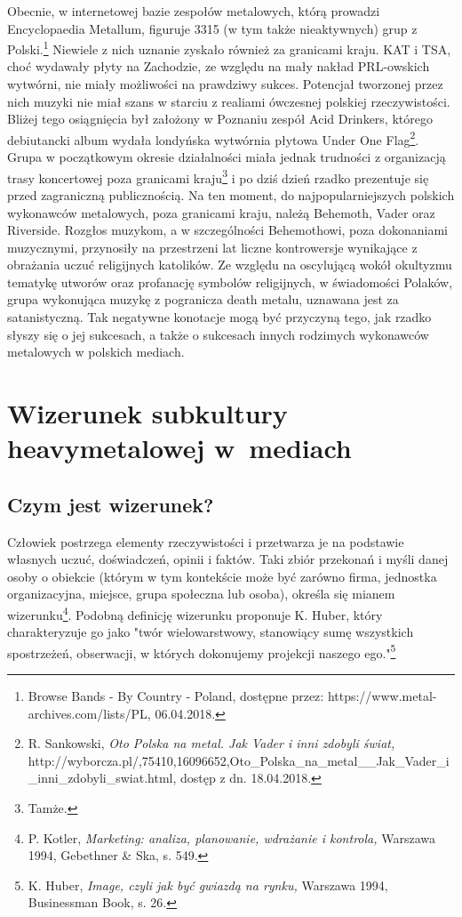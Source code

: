 \documentclass[12pt, a4paper, titlepage]{report}
\begin{document}
Obecnie, w internetowej bazie zespołów metalowych, którą prowadzi Encyclopaedia Metallum, figuruje 3315 (w tym także nieaktywnych) grup z Polski.\footnote{Browse Bands - By Country - Poland, dostępne przez: https://www.metal-archives.com/lists/PL, 06.04.2018.} Niewiele z nich uznanie zyskało również za granicami kraju. KAT i TSA, choć wydawały płyty na Zachodzie, ze względu na mały nakład PRL-owskich wytwórni, nie miały możliwości na prawdziwy sukces. Potencjał tworzonej przez nich muzyki nie miał szans w starciu z realiami ówczesnej polskiej rzeczywistości. Bliżej tego osiągnięcia był założony w Poznaniu zespół Acid Drinkers, którego debiutancki album wydała londyńska wytwórnia płytowa Under One Flag\footnote{R. Sankowski, \textit{Oto Polska na metal. Jak Vader i inni zdobyli świat,} http://wyborcza.pl/,75410,16096652,Oto_Polska_na_metal__Jak_Vader_i_inni_zdobyli_swiat.html, dostęp z dn. 18.04.2018.}. Grupa w początkowym okresie działalności miała jednak trudności z organizacją trasy koncertowej poza granicami kraju\footnote{Tamże.} i po dziś dzień rzadko prezentuje się przed zagraniczną publicznością. Na ten moment, do najpopularniejszych polskich wykonawców metalowych, poza granicami kraju, należą Behemoth, Vader oraz Riverside. Rozgłos muzykom, a w szczególności Behemothowi, poza dokonaniami muzycznymi, przynosiły na przestrzeni lat liczne kontrowersje wynikające z obrażania uczuć religijnych katolików. Ze względu na oscylującą wokół okultyzmu tematykę utworów oraz profanację symbolów religijnych, w świadomości Polaków, grupa wykonująca muzykę z pogranicza death metalu, uznawana jest za satanistyczną. Tak negatywne konotacje mogą być przyczyną tego, jak rzadko słyszy się o jej sukcesach, a także o sukcesach innych rodzimych wykonawców metalowych w polskich mediach. 

\chapter{Wizerunek subkultury heavymetalowej w~mediach}
\section{Czym jest wizerunek?}
Człowiek postrzega elementy rzeczywistości i przetwarza je na podstawie własnych uczuć, doświadczeń, opinii i faktów. Taki zbiór przekonań i myśli danej osoby o obiekcie (którym w tym kontekście może być zarówno firma, jednostka organizacyjna, miejsce, grupa społeczna lub osoba), określa się mianem wizerunku\footnote{P. Kotler, \textit{Marketing: analiza, planowanie, wdrażanie i kontrola,} Warszawa 1994, Gebethner \& Ska, s. 549.}. Podobną definicję wizerunku proponuje K. Huber, który charakteryzuje go jako "twór wielowarstwowy, stanowiący sumę wszystkich spostrzeżeń, obserwacji, w których dokonujemy projekcji naszego ego."\footnote{K. Huber, \textit{Image, czyli jak być gwiazdą na rynku,} Warszawa 1994, Businessman Book, s. 26.} 
\end{document}
